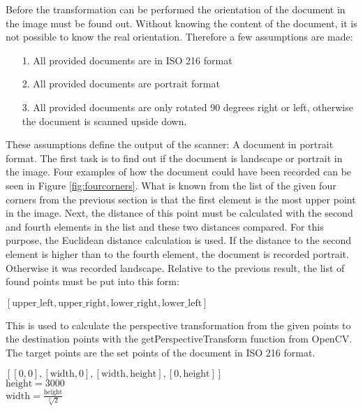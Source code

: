 \documentclass[twocolumn,10pt]{asme2ej}
\newcommand*\redcircled[1]{\tikz[baseline=(char.base)]{
            \node[shape=circle,draw,inner sep=2pt, fill=red!40] (char) {#1};}}
\newcommand*\bluecircled[1]{\tikz[baseline=(char.base)]{
            \node[shape=circle,draw,inner sep=2pt, fill=blue!40] (char) {#1};}}
\begin{document}
Before the transformation can be performed the orientation of the document in the image must be found out.
Without knowing the content of the document, it is not possible to know the real orientation. Therefore a few assumptions are made:
\begin{itemize}
    \item[1.] All provided documents are in ISO 216 format
    \item[2.] All provided documents are portrait format
    \item[3.] All provided documents are only rotated 90 degrees right or left, otherwise the document is scanned upside down.
\end{itemize}
These assumptions define the output of the scanner: A document in portrait format.
The first task is to find out if the document is landscape or portrait in the image.
Four examples of how the document could have been recorded can be seen in Figure \ref{fig:fourcorners}.
What is known from the list of the given four corners from the previous section is that the first element \bluecircled{-} is the most upper point in the image. 
Next, the distance of this point must be calculated with the second and fourth elements \redcircled{-} in the list and these two distances compared. For this purpose, the Euclidean distance calculation is used. If the distance to the second element is higher than to the fourth element, the document is recorded portrait. Otherwise it was recorded landscape. 
Relative to the previous result, the list of found points must be put into this form:
\begin{center}
    $[\textrm{upper\_left}, \textrm{upper\_right}, \textrm{lower\_right}, \textrm{lower\_left}]$
\end{center}
This is used to calculate the perspective transformation from the given points to the destination points with the getPerspectiveTransform\cite{opencv_getPerspectiveTransform} function from OpenCV. 
The target points are the set points of the document in ISO 216 format.
\begin{center}
    $[[0,0], [\textrm{width},0], [\textrm{width},\textrm{height}], [0,\textrm{height}]]$\\
    $\textrm{height}=3000$\\
    $\textrm{width}=\frac{\textrm{height}}{\sqrt[2]{2}}$
\end{center}
\end{document}
